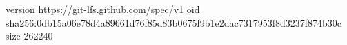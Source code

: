 version https://git-lfs.github.com/spec/v1
oid sha256:0db15a06e78d4a89661d76f85d83b0675f9b1e2dac7317953f8d3237f874b30c
size 262240
